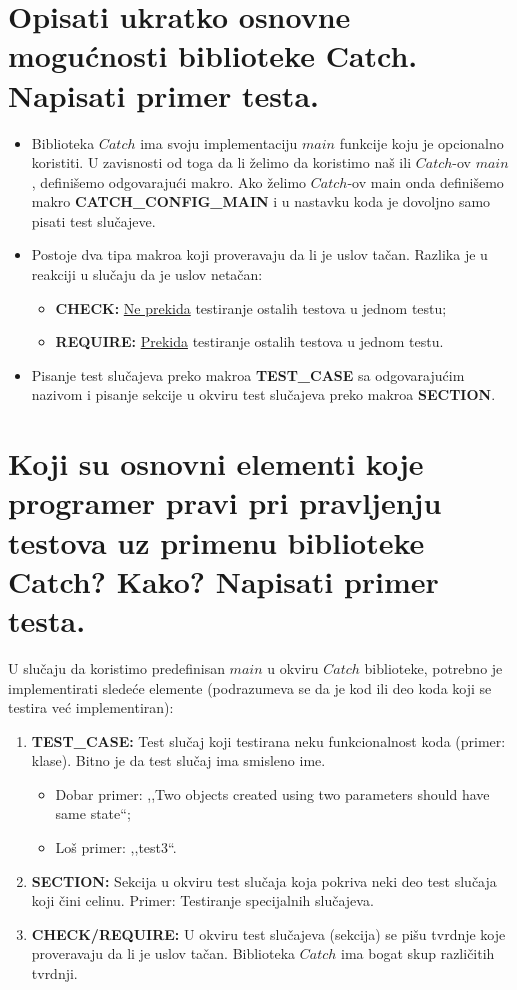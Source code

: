 \documentclass[a4paper]{article}
\begin{document}
\section{Opisati ukratko osnovne mogućnosti biblioteke Catch. Napisati primer testa.}
  \begin{itemize}
    \item Biblioteka $Catch$ ima svoju implementaciju $main$ funkcije koju je opcionalno koristiti.
          U zavisnosti od toga da li želimo da koristimo naš ili $Catch$-ov $main$, definišemo
          odgovarajući makro. Ako želimo $Catch$-ov main onda definišemo makro 
          \textbf{CATCH\_CONFIG\_MAIN} i u nastavku koda je dovoljno samo pisati test slučajeve.
    \item Postoje dva tipa makroa koji proveravaju da li je uslov tačan. Razlika je u reakciji
          u slučaju da je uslov netačan:
          \begin{itemize}
            \item \textbf{CHECK:} \underline{Ne prekida} testiranje ostalih testova u jednom testu;
            \item \textbf{REQUIRE:} \underline{Prekida} testiranje ostalih testova u jednom testu.
          \end{itemize}
    \item Pisanje test slučajeva preko makroa \textbf{TEST\_CASE} sa odgovarajućim nazivom 
          i pisanje sekcije u okviru test slučajeva preko makroa \textbf{SECTION}.
  \end{itemize}
\section{Koji su osnovni elementi koje programer pravi pri pravljenju testova uz primenu biblioteke
         Catch? Kako? Napisati primer testa.}
  U slučaju da koristimo predefinisan $main$ u okviru $Catch$ biblioteke, potrebno je 
  implementirati sledeće elemente (podrazumeva se da je kod ili deo koda koji se testira već 
  implementiran):
  \begin{enumerate}
    \item \textbf{TEST\_CASE:} Test slučaj koji testirana neku funkcionalnost koda (primer: klase).
          Bitno je da test slučaj ima smisleno ime.
          \begin{itemize}
            \item Dobar primer: ,,Two objects created using two parameters should have same state``; 
            \item Loš primer: ,,test3``.
          \end{itemize}
    \item \textbf{SECTION:} Sekcija u okviru test slučaja koja pokriva neki deo test slučaja koji
          čini celinu. Primer: Testiranje specijalnih slučajeva.
    \item \textbf{CHECK/REQUIRE:} U okviru test slučajeva (sekcija) se pišu tvrdnje koje 
          proveravaju da li je uslov tačan. Biblioteka $Catch$ ima bogat skup različitih
          tvrdnji.
  \end{enumerate}
  
\end{document}
